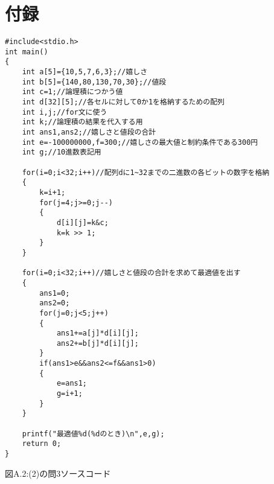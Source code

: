 \documentclass[12pt]{jarticle}
\begin{document}
\section{付録}
\begin{framed}
    \begin{verbatim}
#include<stdio.h>
int main()
{
	int a[5]={10,5,7,6,3};//嬉しさ
	int b[5]={140,80,130,70,30};//値段
	int c=1;//論理積につかう値
	int d[32][5];//各セルに対して0か1を格納するための配列
	int i,j;//for文に使う
	int k;//論理積の結果を代入する用
	int ans1,ans2;//嬉しさと値段の合計
	int e=-100000000,f=300;//嬉しさの最大値と制約条件である300円
	int g;//10進数表記用
			
	for(i=0;i<32;i++)//配列dに1~32までの二進数の各ビットの数字を格納
	{
		k=i+1;
		for(j=4;j>=0;j--)
		{
			d[i][j]=k&c;
			k=k >> 1;
		}
	}
			
	for(i=0;i<32;i++)//嬉しさと値段の合計を求めて最適値を出す
	{
		ans1=0;
		ans2=0;
		for(j=0;j<5;j++)
		{
 			ans1+=a[j]*d[i][j];
			ans2+=b[j]*d[i][j];
		}
		if(ans1>e&&ans2<=f&&ans1>0)
		{
			e=ans1;
			g=i+1;
		}
	}
			
	printf("最適値%d(%dのとき)\n",e,g);
	return 0;
}
    \end{verbatim}
\end{framed}
\begin{center}
    図A.2:(2)の問3ソースコード
\end{center}
\end{document}
